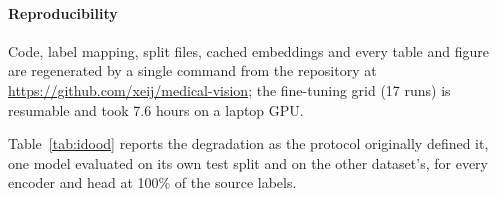 \documentclass[conference]{IEEEtran}
\begin{document}
\paragraph{Reproducibility}
Code, label mapping, split files, cached embeddings and every table and figure are regenerated by a single command from the repository at \url{https://github.com/xeij/medical-vision}; the fine-tuning grid (17 runs) is resumable and took 7.6 hours on a laptop GPU.

\begin{table}[!t]
  \caption{Macro AUROC at 100\% labels on each model's own test split (ID) and the other dataset's test split (OOD), with ID~$-$~OOD and its 95\% interval. Negative values in the NIH-trained block show the test-split difficulty confound of Section~\ref{sec:gapdef}.}
  \label{tab:idood}
  \centering
  
\end{table}

Table~\ref{tab:idood} reports the degradation as the protocol originally defined it, one model evaluated on its own test split and on the other dataset's, for every encoder and head at 100\% of the source labels.



\end{document}
